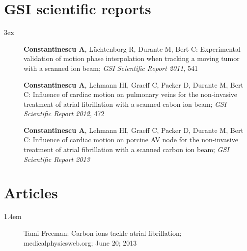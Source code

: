 \section*{GSI scientific reports}
\begin{setlength}{\leftmargini}{3ex}
  \begin{description}
    \item[] \textbf{Constantinescu A}, L\"uchtenborg R, Durante M, Bert C: Experimental validation of motion phase interpolation when tracking a moving tumor with a scanned ion beam; \textit{GSI Scientific Report 2011}, 541
    \item[] \textbf{Constantinescu A}, Lehmann HI, Graeff C, Packer D, Durante M, Bert C: Influence of cardiac motion on pulmonary veins for the non-invasive treatment of atrial fibrillation with a scanned cabon ion beam; \textit{GSI Scientific Report 2012}, 472
    \item[] \textbf{Constantinescu A}, Lehmann HI, Graeff C, Packer D, Durante M, Bert C: Influence of cardiac motion on porcine AV node for the non-invasive treatment of atrial fibrillation with a scanned carbon ion beam; \textit{GSI Scientific Report 2013}
  \end{description}
\end{setlength}

\section*{Articles}
\begin{setlength}{\leftmargini}{1.4em}
  \begin{description}
    \item[] Tami Freeman: Carbon ions tackle atrial fibrillation; medicalphysicsweb.org; June 20; 2013
      \end{description}
\end{setlength}



